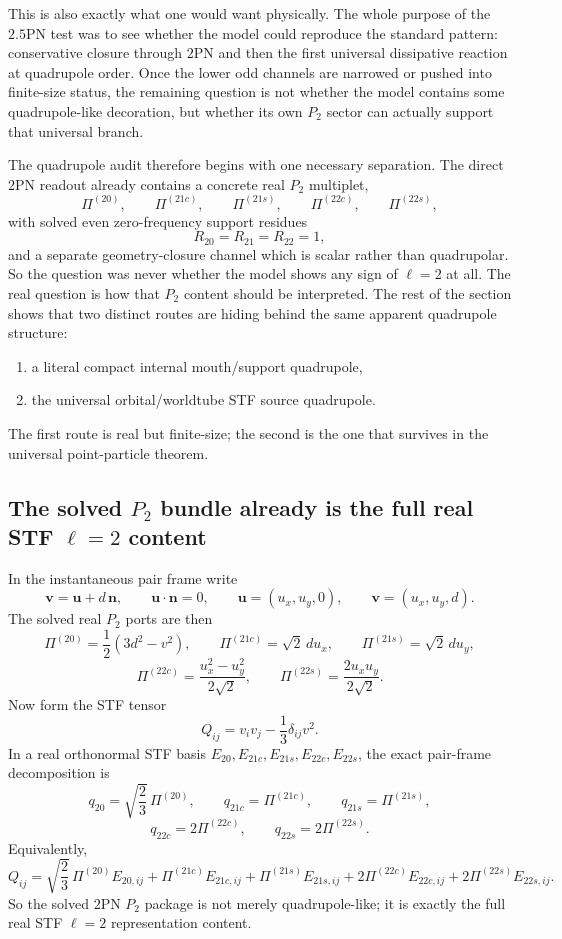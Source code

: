 \documentclass[11pt]{article}
\begin{document}
This is also exactly what one would want physically.  The whole purpose of the
$2.5$PN test was to see whether the model could reproduce the standard pattern:
conservative closure through $2$PN and then the first universal dissipative
reaction at quadrupole order.  Once the lower odd channels are narrowed or
pushed into finite-size status, the remaining question is not whether the model
contains some quadrupole-like decoration, but whether its own $P_2$ sector can
actually support that universal branch.

The quadrupole audit therefore begins with one necessary separation.  The direct
$2$PN readout already contains a concrete real $P_2$ multiplet,
\[
\Pi^{(20)},\qquad
\Pi^{(21c)},\qquad
\Pi^{(21s)},\qquad
\Pi^{(22c)},\qquad
\Pi^{(22s)},
\]
with solved even zero-frequency support residues
\[
R_{20}=R_{21}=R_{22}=1,
\]
and a separate geometry-closure channel which is scalar rather than
quadrupolar.  So the question was never whether the model shows any sign of
$\ell=2$ at all.  The real question is how that $P_2$ content should be
interpreted.  The rest of the section shows that two distinct routes are hiding
behind the same apparent quadrupole structure:
\begin{enumerate}
  \item a literal compact internal mouth/support quadrupole,
  \item the universal orbital/worldtube STF source quadrupole.
\end{enumerate}
The first route is real but finite-size; the second is the one that survives in
the universal point-particle theorem.

\subsection{The solved \texorpdfstring{$P_2$}{P\_2} bundle already is the full real STF \texorpdfstring{$\ell=2$}{ell=2} content}
\label{sec:quadrupole-surviving-representation}

In the instantaneous pair frame write
\[
\mathbf v=\mathbf u+d\,\mathbf n,
\qquad
\mathbf u\cdot\mathbf n=0,
\qquad
\mathbf u=(u_x,u_y,0),
\qquad
\mathbf v=(u_x,u_y,d).
\]
The solved real $P_2$ ports are then
\[
\Pi^{(20)}=\frac12(3d^2-v^2),
\qquad
\Pi^{(21c)}=\sqrt2\,d u_x,
\qquad
\Pi^{(21s)}=\sqrt2\,d u_y,
\]
\[
\Pi^{(22c)}=\frac{u_x^2-u_y^2}{2\sqrt2},
\qquad
\Pi^{(22s)}=\frac{2u_xu_y}{2\sqrt2}.
\]
Now form the STF tensor
\[
Q_{ij}=v_i v_j-\frac13\delta_{ij}v^2.
\]
In a real orthonormal STF basis
\(E_{20},E_{21c},E_{21s},E_{22c},E_{22s}\),
the exact pair-frame decomposition is
\[
q_{20}=\sqrt{\frac23}\,\Pi^{(20)},
\qquad
q_{21c}=\Pi^{(21c)},
\qquad
q_{21s}=\Pi^{(21s)},
\]
\[
q_{22c}=2\Pi^{(22c)},
\qquad
q_{22s}=2\Pi^{(22s)}.
\]
Equivalently,
\[
Q_{ij}
=
\sqrt{\frac23}\,\Pi^{(20)}E_{20,ij}
+\Pi^{(21c)}E_{21c,ij}
+\Pi^{(21s)}E_{21s,ij}
+2\Pi^{(22c)}E_{22c,ij}
+2\Pi^{(22s)}E_{22s,ij}.
\]
So the solved $2$PN $P_2$ package is not merely quadrupole-like; it is exactly
the full real STF $\ell=2$ representation content.
\end{document}
